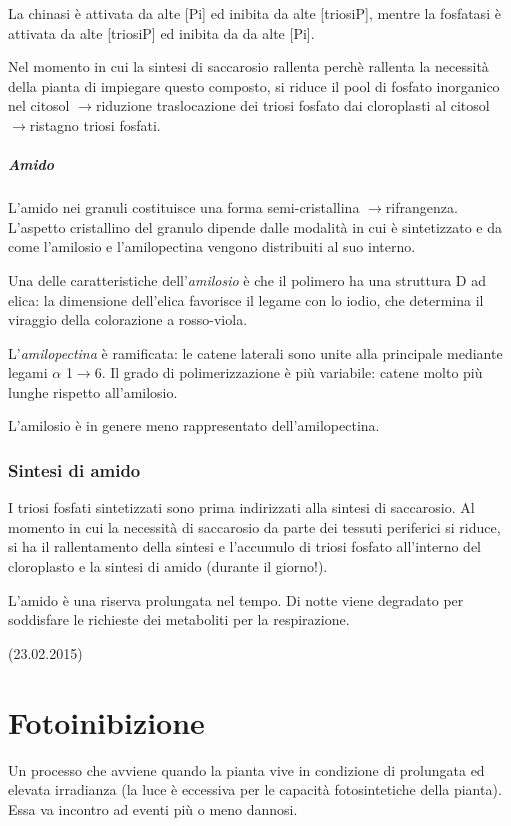 \documentclass[a4paper,12pt]{book}
\newcommand{\freccia}{\ensuremath{\rightarrow}}
\newcommand{\lfreccia}{\ensuremath{\longrightarrow}}
\begin{document}
La chinasi è attivata da alte [Pi] ed
inibita da alte [triosiP], mentre la fosfatasi è attivata da alte [triosiP] ed inibita da da alte [Pi].

Nel momento in cui la sintesi di saccarosio rallenta perchè rallenta la necessità della pianta di impiegare questo composto, si riduce il pool di fosfato inorganico nel citosol \lfreccia riduzione traslocazione dei triosi fosfato dai cloroplasti al citosol \lfreccia ristagno triosi fosfati.

\paragraph{Amido}
L'amido nei granuli costituisce una forma semi-cristallina \lfreccia rifrangenza. L'aspetto cristallino del granulo dipende dalle modalità in cui è sintetizzato e da come l'amilosio e l'amilopectina vengono distribuiti al suo interno.

Una delle caratteristiche dell'\emph{amilosio} è che il polimero ha una struttura D ad elica: la dimensione dell'elica favorisce il legame con lo iodio, che determina il viraggio della colorazione a rosso-viola.

L'\emph{amilopectina} è ramificata: le catene laterali sono unite alla principale mediante legami $\alpha$ 1\freccia6. Il grado di polimerizzazione è più variabile: catene molto più lunghe rispetto all'amilosio.

L'amilosio è in genere meno rappresentato dell'amilopectina.

\subsection{Sintesi di amido}

I triosi fosfati sintetizzati sono prima indirizzati alla sintesi di saccarosio. Al momento in cui la necessità di saccarosio da parte dei tessuti periferici si riduce, si ha il rallentamento della sintesi e l'accumulo di triosi fosfato all'interno del cloroplasto e la sintesi di amido (durante il giorno!).

L'amido è una riserva prolungata nel tempo. Di notte viene degradato per soddisfare le richieste dei metaboliti per la respirazione.

 
 (23.02.2015)
 
 \chapter{Fotoinibizione}
 Un processo che avviene quando la pianta vive in condizione di prolungata ed elevata irradianza (la luce è eccessiva per le capacità fotosintetiche della pianta). Essa va incontro ad eventi più o meno dannosi.
 
\end{document}
